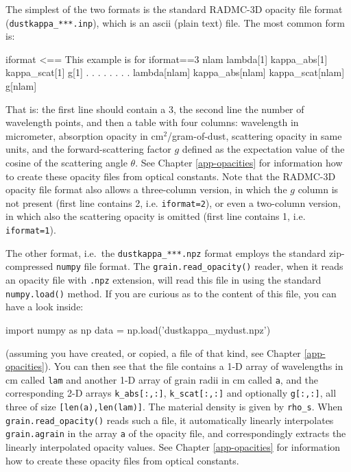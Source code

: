 \documentclass{book}
\newcommand{\code}[1]{{\small\tt #1}}
\begin{document}
The simplest of the two formats is the
standard {\sf RADMC-3D} opacity file format
(\code{dustkappa\_***.inp}), which is an ascii (plain
text) file. The most common form is:
\begin{codebox}
iformat                     <== This example is for iformat==3
nlam
lambda[1]        kappa_abs[1]       kappa_scat[1]      g[1]
   .                  .                  .              .
   .                  .                  .              .
lambda[nlam]    kappa_abs[nlam]   kappa_scat[nlam]    g[nlam]
\end{codebox}
That is: the first line should contain a 3, the second line the number of
wavelength points, and then a table with four columns: wavelength in micrometer,
absorption opacity in cm$^2$/gram-of-dust, scattering opacity in same units, and
the forward-scattering factor $g$ defined as the expectation value of the cosine
of the scattering angle $\theta$. See Chapter \ref{app-opacities} for
information how to create these opacity files from optical constants.
Note that the {\sf RADMC-3D} opacity file format also allows a three-column
version, in which the $g$ column is not present (first line contains 2,
i.e. \code{iformat=2}), or even a two-column version, in which also the
scattering opacity is omitted (first line contains 1, i.e. \code{iformat=1}).

The other format, i.e.\ the \code{dustkappa\_***.npz} format employs the
standard zip-compressed \code{numpy} file format. The
\code{grain.read\_opacity()} reader, when it reads an opacity file with
\code{.npz} extension, will read this file in using the standard
\code{numpy.load()} method. If you are curious as to the content of this
file, you can have a look inside:
\begin{codebox}
import numpy as np
data = np.load('dustkappa_mydust.npz')
\end{codebox}
(assuming you have created, or copied, a file of that kind, see
Chapter \ref{app-opacities}). You can then see that
the file contains a 1-D array of wavelengths in cm
called \code{lam} and another 1-D array of grain radii in cm called \code{a},
and the corresponding 2-D arrays \code{k\_abs[:,:]}, \code{k\_scat[:,:]} and
optionally \code{g[:,:]}, all three of size \code{[len(a),len(lam)]}. The
material density is given by \code{rho\_s}. When
\code{grain.read\_opacity()} reads such a file, it automatically linearly
interpolates \code{grain.agrain} in the array \code{a} of the opacity
file, and correspondingly extracts the linearly interpolated opacity
values. See Chapter \ref{app-opacities} for information how
to create these opacity files from optical constants.
\end{document}
